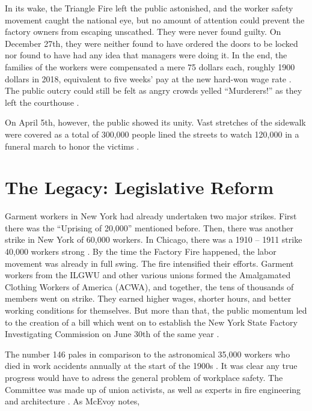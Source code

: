 \documentclass[12pt]{article}
\begin{document}
In its wake, the Triangle Fire left the public astonished, and the worker safety
movement caught the national eye, but no amount of attention could prevent the
factory owners from escaping unscathed. They were never found guilty. On December
27th, they were neither found to have ordered the doors to be locked nor
found to have had any idea that managers were doing it. In the end, the families of the
workers were compensated a mere 75 dollars each, roughly 1900 dollars in 2018,
equivalent to five weeks' pay at the new hard-won wage rate
\parencite[9]{robinson2018crimes}. The public outcry could still be felt as
angry crowds yelled ``Murderers!'' as they left the courthouse
\parencite[9]{robinson2018crimes}.

On April 5th, however, the public showed its unity. Vast stretches of the
sidewalk were covered as a total of 300,000 people lined the streets to watch
120,000 in a funeral march to honor the victims \parencite[644]{Ev1995}.

\section{The Legacy: Legislative Reform}

Garment workers in New York had already undertaken two major strikes. First
there was the ``Uprising of 20,000'' mentioned before. Then, there was another
strike in New York of 60,000 workers. In Chicago, there was a 1910 -- 1911 strike 40,000
workers strong \parencite{WorkingClass}. By the time the Factory Fire
happened, the labor movement was already in full swing. The fire intensified
their efforts. Garment workers from the ILGWU and other various unions formed
the Amalgamated Clothing Workers of America (ACWA), and together, the tens of
thousands of members went on strike. They earned higher wages, shorter hours, 
and better working conditions for themselves. But more than that, the public
momentum led to the creation of a bill which went on to establish the New York
State Factory Investigating Commission on June 30th of the same year
\parencite{Ev1995}.

The number 146 pales in comparison to the astronomical 35,000 workers who died
in work accidents annually at the start of the 1900s \parencite{WorkingClass}.
It was clear any true progress would have to adress the general problem of
workplace safety. The Committee was made up of union activists, as well as experts
in fire engineering and architecture \parencite[5]{martineztriangle}. As McEvoy
notes,
\end{document}
